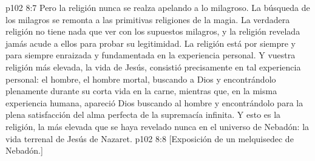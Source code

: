 \vs p102 8:7 Pero la religión nunca se realza apelando a lo milagroso. La búsqueda de los milagros se remonta a las primitivas religiones de la magia. La verdadera religión no tiene nada que ver con los supuestos milagros, y la religión revelada jamás acude a ellos para probar su legitimidad. La religión está por siempre y para siempre enraizada y fundamentada en la experiencia personal. Y vuestra religión más elevada, la vida de Jesús, consistió precisamente en tal experiencia personal: el hombre, el hombre mortal, buscando a Dios y encontrándolo plenamente durante su corta vida en la carne, mientras que, en la misma experiencia humana, apareció Dios buscando al hombre y encontrándolo para la plena satisfacción del alma perfecta de la supremacía infinita. Y esto es la religión, la más elevada que se haya revelado nunca en el universo de Nebadón: la vida terrenal de Jesús de Nazaret.
\vsetoff
\vs p102 8:8 [Exposición de un melquisedec de Nebadón.]
